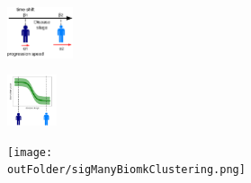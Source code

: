 \begin{frame}
\begin{columns}[T]
\begin{column}{.3\textwidth}
    \vspace{-2em}
    
    \begin{figure}
    \centering
    \includegraphics[height=1.5cm]{disease_axis.png}
    \end{figure}
    
    \begin{figure}
    \centering
    \includegraphics[height=1.5cm, trim=120 0 120 0]{Disease_progression_one_sigmoid_confidence.png}
    \end{figure}
    
    \begin{figure}
    \centering
    \texttt{[image: \\outFolder/sigManyBiomkClustering.png]}
    \end{figure}

    \end{column}
  \end{columns}
  
% 
%   


\end{frame}



